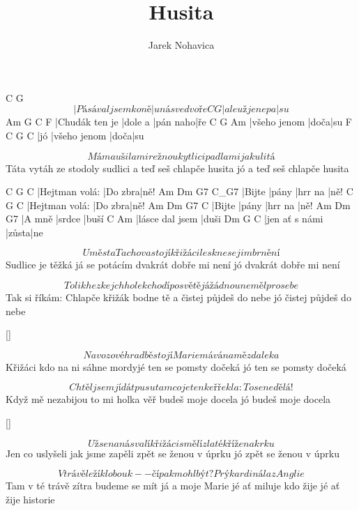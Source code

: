 \documentclass{song}
\title{Husita}
\author{Jarek Nohavica}
\begin{document}
\begin{multicols}{2}

\strophe
   C                  G
\[ |Pásával jsem koně |u nás ve dvoře
C              G
|ale už je nepa|su \]
Am             G       C        F
|Chudák ten je |dole a |pán naho|ře
C            G    Am
|všeho jenom |doča|su
F   C            G    C
|jó |všeho jenom |doča|su
\endstrophe

\strophe*
\[ Máma ušila mi režnou kytlici
padla mi jak ulitá \]
Táta vytáh ze stodoly sudlici
a teď seš chlapče husita
jó a teď seš chlapče husita
\endstrophe

   C              G       C
|Hejtman volá: |Do zbra|ně!
Am     Dm    G7      C_G7
|Bijte |pány |hrr na |ně!
   C              G       C
|Hejtman volá: |Do zbra|ně!
Am     Dm    G7      C
|Bijte |pány |hrr na |ně!
Am     Dm     G7
|A mně |srdce |buší
C               Am
|lásce dal jsem |duši
Dm             G     C
|jen ať s námi |zůsta|ne
\endstrophe

\strophe*
\[ U města Tachova stojí křižáci
leskne se jim brnění \]
Sudlice je těžká já se potácím
dvakrát dobře mi není
jó dvakrát dobře mi není
\endstrophe

\strophe*
\[ Tolik hezkejch holek chodí po světě
já žádnou neměl pro sebe \]
Tak si říkám: Chlapče křižák bodne tě
a čistej půjdeš do nebe
jó čistej půjdeš do nebe
\endstrophe

\ref{}

\strophe*
\[ Na vozové hradbě stojí Marie
mává na mě zdaleka \]
Křižáci kdo na ni sáhne mordyjé
ten se pomsty dočeká
jó ten se pomsty dočeká
\endstrophe

\strophe*
\[ Chtěl jsem jí dát pusu tam co je ten keř
řekla: To se nedělá! \]
Když mě nezabijou to mi holka věř
budeš moje docela
jó budeš moje docela
\endstrophe

\ref{}

\strophe*
\[ Už se na nás valí křižáci smělí
zlaté kříže na krku \]
Jen co uslyšeli jak jsme zapěli
zpět se ženou v úprku
jó zpět se ženou v úprku
\endstrophe

\strophe*
\[ V trávě leží klobouk -- čípak mohl být?
Prý kardinála z Anglie \]
Tam v té trávě zítra budeme se mít
já a moje Marie
jé ať miluje kdo žije
jé ať žije historie
\endstrophe

\end{multicols}
\end{document}

